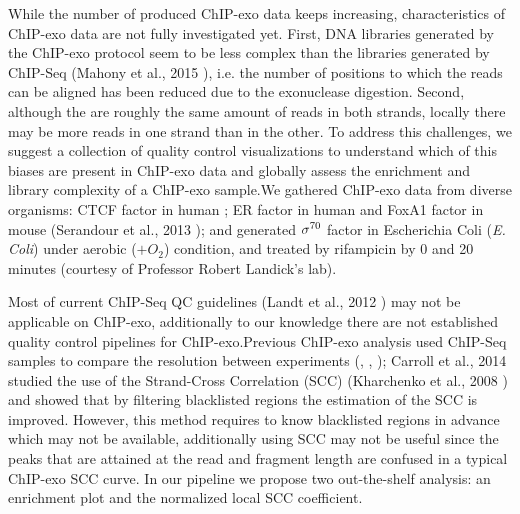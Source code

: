 \documentclass[11pt]{article}\usepackage[]{graphicx}\usepackage[]{color}
\begin{document}
While the number of produced ChIP-exo data keeps increasing,
characteristics of ChIP-exo data are not fully investigated
yet. First, DNA libraries generated by the ChIP-exo protocol seem to
be less complex than the libraries generated by ChIP-Seq (Mahony et
al., 2015 \cite{exo_review}), i.e. the number of positions to which
the reads can be aligned has been reduced due to the exonuclease
digestion. Second, although the are roughly the same amount of reads
in both strands, locally there may be more reads in one strand than in
the other. To address this challenges, we suggest a collection of
quality control visualizations to understand which of this biases are
present in ChIP-exo data and globally assess the enrichment and
library complexity of a ChIP-exo sample.We gathered ChIP-exo data from
diverse organisms: CTCF factor in human \cite{exo1}; ER factor in
human and FoxA1 factor in mouse (Serandour et al., 2013
\cite{exoillumina}); and generated $\sigma^{70}$ factor in Escherichia Coli
(\emph{E. Coli}) under aerobic ($ + O_2$) condition, and treated by
rifampicin by 0 and 20 minutes (courtesy of Professor Robert Landick's
lab).

Most of current ChIP-Seq QC guidelines (Landt et al., 2012
\cite{encode_qc}) may not be applicable on ChIP-exo, additionally to
our knowledge there are not established quality control pipelines for
ChIP-exo.Previous ChIP-exo analysis used ChIP-Seq samples to compare
the resolution between experiments (\cite{exo1}, \cite{exo2},
\cite{exoillumina}); Carroll et al., 2014 \cite{carroll.qc} studied
the use of the Strand-Cross Correlation (SCC) (Kharchenko et al., 2008
\cite{strandcc}) and showed that by filtering blacklisted regions the
estimation of the SCC is improved. However, this method requires to
know blacklisted regions in advance which may not be available,
additionally using SCC may not be useful since the peaks that are
attained at the read and fragment length are confused in a typical
ChIP-exo SCC curve.  In our pipeline we propose two out-the-shelf
analysis: an enrichment plot and the normalized local SCC coefficient.
\end{document}
